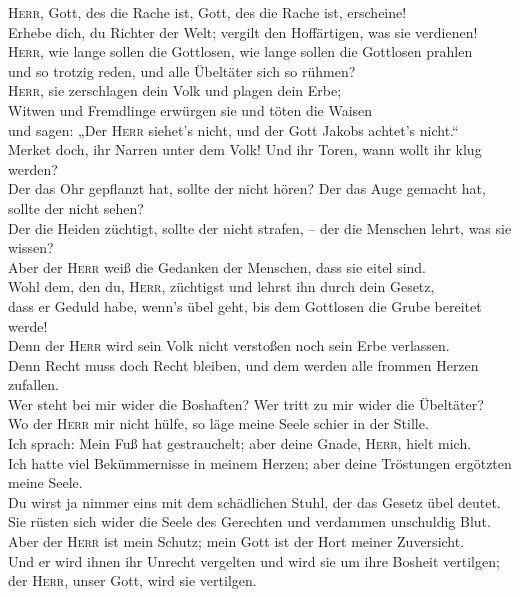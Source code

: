  \textsc{Herr}, Gott, des die Rache ist, Gott, des die
Rache ist, erscheine!\\
 Erhebe dich, du Richter der Welt; vergilt den
Hoffärtigen, was sie verdienen!\\
 \textsc{Herr}, wie lange sollen die Gottlosen, wie lange
sollen die Gottlosen prahlen\\
 und so trotzig reden, und alle Übeltäter sich so
rühmen?\\
 \textsc{Herr}, sie zerschlagen dein Volk und plagen dein
Erbe;\\
 Witwen und Fremdlinge erwürgen sie und töten die Waisen\\
 und sagen: „Der \textsc{Herr} siehet's nicht, und der
Gott Jakobs achtet's nicht.``\\
 Merket doch, ihr Narren unter dem Volk! Und ihr Toren,
wann wollt ihr klug werden?\\
 Der das Ohr gepflanzt hat, sollte der nicht hören? Der
das Auge gemacht hat, sollte der nicht sehen?\\
 Der die Heiden züchtigt, sollte der nicht strafen, --
der die Menschen lehrt, was sie wissen?\\
 Aber der \textsc{Herr} weiß die Gedanken der Menschen,
dass sie eitel sind.\\
 Wohl dem, den du, \textsc{Herr}, züchtigst und lehrst
ihn durch dein Gesetz,\\
 dass er Geduld habe, wenn's übel geht, bis dem Gottlosen
die Grube bereitet werde!\\
 Denn der \textsc{Herr} wird sein Volk nicht verstoßen
noch sein Erbe verlassen.\\
 Denn Recht muss doch Recht bleiben, und dem werden alle
frommen Herzen zufallen.\\
 Wer steht bei mir wider die Boshaften? Wer tritt zu mir
wider die Übeltäter?\\
 Wo der \textsc{Herr} mir nicht hülfe, so läge meine
Seele schier in der Stille.\\
 Ich sprach: Mein Fuß hat gestrauchelt; aber deine Gnade,
\textsc{Herr}, hielt mich.\\
 Ich hatte viel Bekümmernisse in meinem Herzen; aber
deine Tröstungen ergötzten meine Seele.\\
 Du wirst ja nimmer eins mit dem schädlichen Stuhl, der
das Gesetz übel deutet.\\
 Sie rüsten sich wider die Seele des Gerechten und
verdammen unschuldig Blut.\\
 Aber der \textsc{Herr} ist mein Schutz; mein Gott ist
der Hort meiner Zuversicht.\\
 Und er wird ihnen ihr Unrecht vergelten und wird sie um
ihre Bosheit vertilgen; der \textsc{Herr}, unser Gott, wird sie
vertilgen.

